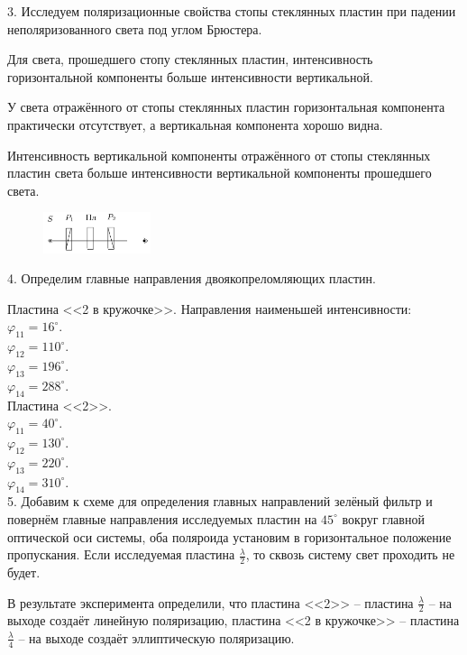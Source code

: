 3. Исследуем поляризационные свойства стопы стеклянных пластин при падении неполяризованного света под углом Брюстера.

Для света, прошедшего стопу стеклянных пластин, интенсивность горизонтальной компоненты больше интенсивности вертикальной.

У света отражённого от стопы стеклянных пластин горизонтальная компонента практически отсутствует, а вертикальная компонента хорошо видна.

Интенсивность вертикальной компоненты отражённого от стопы стеклянных пластин света больше интенсивности вертикальной компоненты прошедшего света.

\begin{figure}
	\centering
	\includegraphics[width=0.28\textwidth]{../Изображения/main directions.png}
\end{figure}

4. Определим главные направления двоякопреломляющих пластин.

Пластина <<2 в кружочке>>. Направления наименьшей интенсивности: \\
$\varphi_{11} = 16^\circ$. \\
$\varphi_{12} = 110^\circ$. \\
$\varphi_{13} = 196^\circ$. \\
$\varphi_{14} = 288^\circ$. \\

Пластина <<2>>. \\
$\varphi_{11} = 40^\circ$. \\
$\varphi_{12} = 130^\circ$. \\
$\varphi_{13} = 220^\circ$. \\
$\varphi_{14} = 310^\circ$. \\

5. Добавим к схеме для определения главных направлений зелёный фильтр и повернём главные направления исследуемых пластин на $45^\circ$ вокруг главной оптической оси системы, оба поляроида установим в горизонтальное положение пропускания. Если исследуемая пластина $\frac{\lambda}{2}$, то сквозь систему свет проходить не будет.

В результате эксперимента определили, что пластина <<2>> -- пластина $\frac{\lambda}{2}$ -- на выходе создаёт линейную поляризацию, пластина <<2 в кружочке>> -- пластина $\frac{\lambda}{4}$ -- на выходе создаёт эллиптическую поляризацию.

